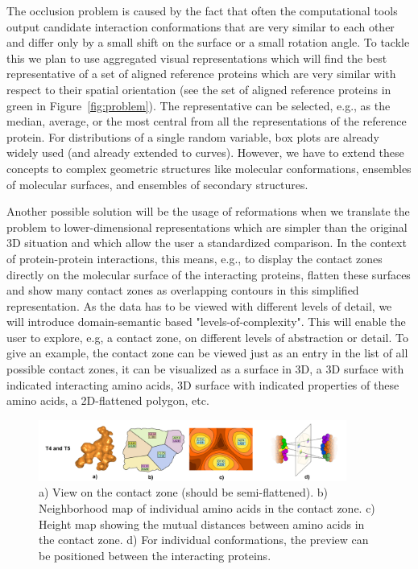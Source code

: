 \documentclass[11pt,a4paper,titlepage,oneside,onecolumn]{article}
\begin{document}
The occlusion problem is caused by the fact that often the computational tools output candidate interaction conformations that are very similar to each other and differ only by a small shift on the surface or a small rotation angle.
To tackle this we plan to use aggregated visual representations which will find the best representative of a set of aligned reference proteins which are very similar with respect to their spatial orientation (see the set of aligned reference proteins in green in Figure~\ref{fig:problem}).
The representative can be selected, e.g.,  as the median, average, or the most central from all the representations of the reference protein.
For distributions of a single random variable, box plots are already widely used (and already extended to curves).
However, we have to extend these concepts to complex geometric structures like molecular conformations, ensembles of molecular surfaces, and ensembles of secondary structures.

Another possible solution will be the usage of reformations when we translate the problem to lower-dimensional representations which are simpler than the original 3D situation and which allow the user a standardized comparison. 
In the context of protein-protein interactions, this means, e.g., to display the contact zones directly on the molecular surface of the interacting proteins, flatten these surfaces and show many contact zones as overlapping contours in this simplified representation.
As the data has to be viewed with different levels of detail, we will introduce domain-semantic based "levels-of-complexity". 
This will enable the user to explore, e.g, a contact zone, on different levels of abstraction or detail.
To give an example, the contact zone can be viewed just as an entry in the list of all possible contact zones, it can be visualized as a surface in 3D, a 3D surface with indicated interacting amino acids, 3D surface with indicated properties of these amino acids, a 2D-flattened polygon, etc.

\setlength\intextsep{0pt}
\begin{figure}[ht]
\vspace{-5mm}
\centering
\includegraphics[width=0.9\textwidth]{pics/previewsmall.png}
\vspace{-3mm}
\caption{a) View on the contact zone (should be semi-flattened). b) Neighborhood map of individual amino acids in the contact zone. c) Height map showing the mutual distances between amino acids in the contact zone. d) For individual conformations, the preview can be positioned between the interacting proteins.}
\label{fig:preview}
\end{figure}
\end{document}
